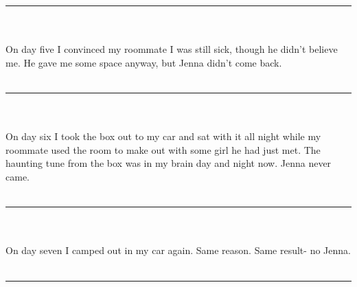 \documentclass[a4paper]{article}
\begin{document}
\hrule ~ \\ \\

On day five I convinced my roommate I was still sick, though he didn’t believe me. He gave me some space anyway, but Jenna didn’t come back. \\ \\

\hrule ~ \\ \\

On day six I took the box out to my car and sat with it all night while my roommate used the room to make out with some girl he had just met.
The haunting tune from the box was in my brain day and night now.
Jenna never came. \\ \\

\hrule ~ \\ \\

On day seven I camped out in my car again. Same reason. Same result- no Jenna. \\ \\

\hrule ~ \\ \\
\end{document}
